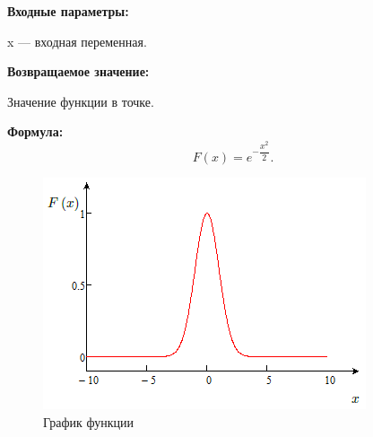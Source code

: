 \textbf{Входные параметры:}

 x --- входная переменная.

\textbf{Возвращаемое значение:}
 
 Значение функции в точке.
 
\textbf{Формула:}
\begin{equation*}
F\left(x \right)=e^{-\dfrac{x^2}{2}}.
\end{equation*}

 \begin{figure} [h] 
   \center
   \includegraphics {MHL_ExpMSxD2_Graph.png}
   \caption{График функции} 
   \label{img:MHL_ExpMSxD2_Graph}  
 \end{figure}
 
